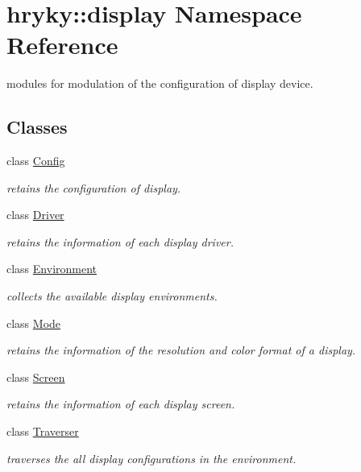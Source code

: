 \hypertarget{namespacehryky_1_1display}{\section{hryky\-:\-:display Namespace Reference}
\label{namespacehryky_1_1display}
}


modules for modulation of the configuration of display device.  


\subsection*{Classes}
\begin{DoxyCompactItemize}
\item 
class \hyperlink{classhryky_1_1display_1_1_config}{Config}
\begin{DoxyCompactList}\small\item\em retains the configuration of display. \end{DoxyCompactList}\item 
class \hyperlink{classhryky_1_1display_1_1_driver}{Driver}
\begin{DoxyCompactList}\small\item\em retains the information of each display driver. \end{DoxyCompactList}\item 
class \hyperlink{classhryky_1_1display_1_1_environment}{Environment}
\begin{DoxyCompactList}\small\item\em collects the available display environments. \end{DoxyCompactList}\item 
class \hyperlink{classhryky_1_1display_1_1_mode}{Mode}
\begin{DoxyCompactList}\small\item\em retains the information of the resolution and color format of a display. \end{DoxyCompactList}\item 
class \hyperlink{classhryky_1_1display_1_1_screen}{Screen}
\begin{DoxyCompactList}\small\item\em retains the information of each display screen. \end{DoxyCompactList}\item 
class \hyperlink{classhryky_1_1display_1_1_traverser}{Traverser}
\begin{DoxyCompactList}\small\item\em traverses the all display configurations in the environment. \end{DoxyCompactList}\end{DoxyCompactItemize}
